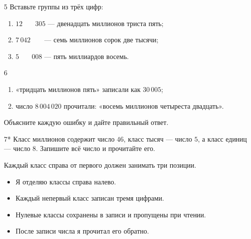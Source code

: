 \begin{homeworktask}{5}
  Вставьте группы из трёх цифр:
  \begin{enumerate}
    \item \(12\,\boxed{\phantom{000}}\,305\) --- двенадцать миллионов триста пять;
    \item \(7\,042\,\boxed{\phantom{000}}\) --- семь миллионов сорок две тысячи;
    \item \(5\,\boxed{\phantom{000}}\,008\) --- пять миллиардов восемь.
  \end{enumerate}
  \answerspace{15mm}
\end{homeworktask}

\begin{homeworktask}{6}
  \begin{enumerate}
    \item «тридцать миллионов пять» записали как \(30\,005\);
    \item число \(8\,004\,020\) прочитали: «восемь миллионов четыреста двадцать».
  \end{enumerate}
  Объясните каждую ошибку и дайте правильный ответ.
  \answerspace{28mm}
\end{homeworktask}

\begin{homeworktask}{7*}
  Класс миллионов содержит число \(46\), класс тысяч --- число \(5\),
  а класс единиц --- число \(8\). Запишите всё число и прочитайте его.

  \begin{hintbox}
    Каждый класс справа от первого должен занимать три позиции.
  \end{hintbox}
  \answerspace{18mm}
\end{homeworktask}

\begin{selfcheck}
  \begin{itemize}[label=\(\square\),leftmargin=1.7em,itemsep=0.25em,topsep=0.2em]
    \item Я отделяю классы справа налево.
    \item Каждый непервый класс записан тремя цифрами.
    \item Нулевые классы сохранены в записи и пропущены при чтении.
    \item После записи числа я прочитал его обратно.
  \end{itemize}
\end{selfcheck}

